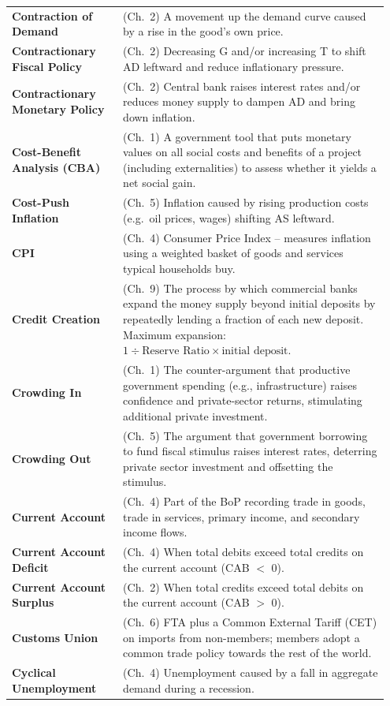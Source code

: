 \documentclass[11pt, a4paper, twoside]{book}
\begin{document}
\begin{longtable}{@{}>{\RaggedRight\arraybackslash}p{0.28\linewidth}>{\RaggedRight\arraybackslash}p{0.67\linewidth}@{}}
\textbf{Contraction of Demand} & (Ch.~2) A movement up the demand curve caused by a rise in the good's own price. \\
\textbf{Contractionary Fiscal Policy} & (Ch.~2) Decreasing G and/or increasing T to shift AD leftward and reduce inflationary pressure. \\
\textbf{Contractionary Monetary Policy} & (Ch.~2) Central bank raises interest rates and/or reduces money supply to dampen AD and bring down inflation. \\
\textbf{Cost-Benefit Analysis (CBA)} & (Ch.~1) A government tool that puts monetary values on all social costs and benefits of a project (including externalities) to assess whether it yields a net social gain. \\
\textbf{Cost-Push Inflation} & (Ch.~5) Inflation caused by rising production costs (e.g.\ oil prices, wages) shifting AS leftward. \\
\textbf{CPI} & (Ch.~4) Consumer Price Index -- measures inflation using a weighted basket of goods and services typical households buy. \\
\textbf{Credit Creation} & (Ch.~9) The process by which commercial banks expand the money supply beyond initial deposits by repeatedly lending a fraction of each new deposit. Maximum expansion: $1 \div \text{Reserve Ratio} \times \text{initial deposit}$. \\
\textbf{Crowding In} & (Ch.~1) The counter-argument that productive government spending (e.g., infrastructure) raises confidence and private-sector returns, stimulating additional private investment. \\
\textbf{Crowding Out} & (Ch.~5) The argument that government borrowing to fund fiscal stimulus raises interest rates, deterring private sector investment and offsetting the stimulus. \\
\textbf{Current Account} & (Ch.~4) Part of the BoP recording trade in goods, trade in services, primary income, and secondary income flows. \\
\textbf{Current Account Deficit} & (Ch.~4) When total debits exceed total credits on the current account (CAB $<$ 0). \\
\textbf{Current Account Surplus} & (Ch.~2) When total credits exceed total debits on the current account (CAB $>$ 0). \\
\textbf{Customs Union} & (Ch.~6) FTA plus a Common External Tariff (CET) on imports from non-members; members adopt a common trade policy towards the rest of the world. \\
\textbf{Cyclical Unemployment} & (Ch.~4) Unemployment caused by a fall in aggregate demand during a recession. \\


\end{longtable}
\end{document}
